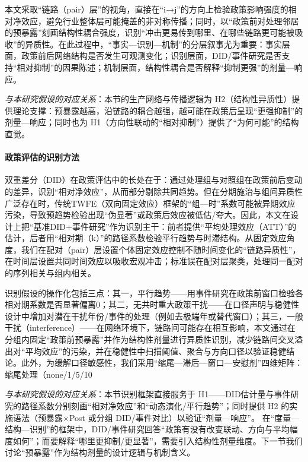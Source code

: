 本文采取“链路（pair）层”的视角，直接在“i→j”的方向上检验政策影响强度的相对净效应，避免行业整体层可能掩盖的非对称传播；同时，以“政策前对处理邻居的预暴露”刻画结构性耦合强度，识别“冲击更易传到哪里、在哪些链路更可能被吸收”的异质性。在此过程中，“事实—识别—机制”的分层叙事尤为重要：事实层面，政策前后网络结构是否发生可观测变化；识别层面，DID/事件研究是否支持“相对抑制”的因果陈述；机制层面，结构性耦合是否解释“抑制更强”的剂量—响应。

\noindent\textit{与本研究假设的对应关系}：本节的生产网络与传播逻辑为 H2（结构性异质性）提供理论支撑：预暴露越高，沿链路的耦合越强，越可能在政策后呈现“更强抑制”的剂量—响应；同时也为 H1（方向性联动的“相对抑制”）提供了“为何可能”的结构直觉。
\paragraph{政策评估的识别方法}
双重差分（DID）在政策评估中的长处在于：通过处理组与对照组在政策前后变动的差异，识别“相对净效应”，从而部分剔除共同趋势。但在分期施治与组间异质性广泛存在时，传统TWFE（双向固定效应）框架的“组—时”系数可能被异期效应污染，导致预趋势检验出现“伪显著”或政策后效应被低估/夸大\citep{sun2021event}。因此，本文在设计上把“基准DID+事件研究”作为识别主干：前者提供“平均处理效应（ATT）”的估计，后者用“相对期（k）”的路径系数检验平行趋势与时滞结构。从固定效应角度，我们在配对（pair）层设置个体固定效应控制不随时间变化的“链路异质性”，在时间层设置共同时间效应以吸收宏观冲击；标准误在配对层聚类，处理同一配对的序列相关与组内相关\citep{bertrand2004much,cameron2015practitioner}。

识别假设的操作化包括三点：其一，平行趋势——用事件研究在政策前窗口检验各相对期系数是否显著偏离0；其二，无共时重大政策干扰——在口径声明与稳健性设计中增加对潜在干扰年份/事件的处理（例如去极端年或替代窗口）；其三，一般干扰（interference）——在网络环境下，链路间可能存在相互影响，本文通过在分组内固定“政策前预暴露”并作为结构性剂量进行异质性识别，减少链路间交叉溢出对“平均效应”的污染，并在稳健性中扫描阈值、聚合与方向口径以验证稳健结论\citep{aronow2017interference,athey2018network}。此外，为缓解口径敏感性，我们采用“缩尾—滞后—窗口—安慰剂”四维矩阵：缩尾处理（none/1/5/10%

\noindent\textit{与本研究假设的对应关系}：本节识别框架直接服务于 H1——DID估计量与事件研究的路径系数分别刻画“相对净效应”和“动态演化/平行趋势”；同时提供 H2 的实施语法（预暴露×Post 或分组 DID/事件对比）以验证“剂量—响应”。
在“度量—结构—识别”的框架中，DID/事件研究回答“政策有没有改变联动、方向与平均幅度如何”；而要解释“哪里更抑制/更显著”，需要引入结构性剂量维度。下一节我们讨论“预暴露”作为结构剂量的设计逻辑与机制含义。

